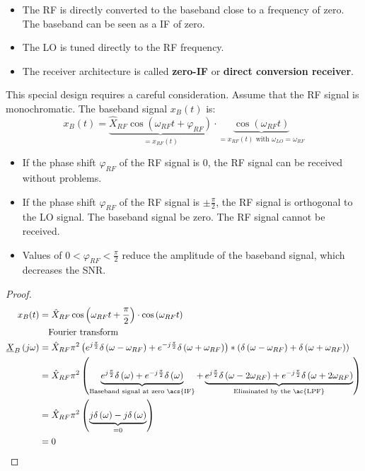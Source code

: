 \begin{refsection}
\begin{itemize}
	\item The \ac{RF} is directly converted to the baseband close to a frequency of zero. The baseband can be seen as a \ac{IF} of zero.
	\item The \ac{LO} is tuned directly to the \ac{RF} frequency.
	\item The receiver architecture is called  \textbf{zero-\acs{IF}} or  \textbf{direct conversion receiver}.
\end{itemize}

This special design requires a careful consideration. Assume that the \ac{RF} signal is monochromatic. The baseband signal $x_B(t)$ is:
\begin{equation}
	x_B(t) = \underbrace{\hat{X}_{RF} \cos\left(\omega_{RF} t + \varphi_{RF}\right)}_{= x_{RF}(t)} \cdot \underbrace{\cos\left(\omega_{RF} t\right)}_{= x_{RF}(t) \text{ with } \omega_{LO} = \omega_{RF}}
\end{equation}

\begin{itemize}
	\item If the phase shift $\varphi_{RF}$ of the \ac{RF} signal is $0$, the \ac{RF} signal can be received without problems.
	\item If the phase shift $\varphi_{RF}$ of the \ac{RF} signal is $\pm \frac{\pi}{2}$, the \ac{RF} signal is orthogonal to the \ac{LO} signal. The baseband signal be zero. The \ac{RF} signal cannot be received.
	\item Values of $0 < \varphi_{RF} < \frac{\pi}{2}$ reduce the amplitude of the baseband signal, which decreases the \ac{SNR}.
\end{itemize}

\begin{proof}{}
	\begin{equation*}
		\begin{split}
			x_B(t) &= \hat{X}_{RF} \cos\left(\omega_{RF} t + \frac{\pi}{2}\right) \cdot \cos\left(\omega_{RF} t\right) \\
			 & \quad \text{Fourier transform} \\
			\underline{X}_B\left(j\omega\right) &= \hat{X}_{RF} \pi^2 \left( e^{j \frac{\pi}{2}} \delta\left(\omega-\omega_{RF}\right) + e^{-j \frac{\pi}{2}} \delta\left(\omega+\omega_{RF}\right) \right) * \left( \delta\left(\omega-\omega_{RF}\right) + \delta\left(\omega+\omega_{RF}\right) \right) \\
			 &= \hat{X}_{RF} \pi^2 \left( \underbrace{e^{j \frac{\pi}{2}} \delta\left(\omega\right) + e^{-j \frac{\pi}{2}} \delta\left(\omega\right)}_{\text{Baseband signal at zero \acs{IF}}} + \underbrace{e^{j \frac{\pi}{2}} \delta\left(\omega-2\omega_{RF}\right) + e^{-j \frac{\pi}{2}} \delta\left(\omega+2\omega_{RF}\right)}_{\text{Eliminated by the \ac{LPF}}} \right) \\
			 &= \hat{X}_{RF} \pi^2 \left( \underbrace{j \delta\left(\omega\right) - j \delta\left(\omega\right)}_{= 0} \right) \\
			 &= 0
		\end{split}
	\end{equation*}
	

\end{proof}
\end{refsection}
